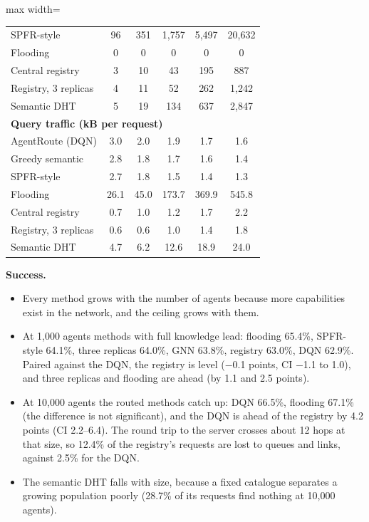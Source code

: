 \documentclass[journal]{IEEEtran}
\begin{document}
\begin{table}[!t]
\begin{adjustbox}{max width=\columnwidth}
\begin{tabular}{lccccc}
SPFR-style & 96 & 351 & 1,757 & 5,497 & 20,632 \\
Flooding & 0 & 0 & 0 & 0 & 0 \\
Central registry & 3 & 10 & 43 & 195 & 887 \\
Registry, 3 replicas & 4 & 11 & 52 & 262 & 1,242 \\
Semantic DHT & 5 & 19 & 134 & 637 & 2,847 \\
\multicolumn{6}{l}{\textbf{Query traffic (kB per request)}} \\
AgentRoute (DQN) & 3.0 & 2.0 & 1.9 & 1.7 & 1.6 \\
Greedy semantic & 2.8 & 1.8 & 1.7 & 1.6 & 1.4 \\
SPFR-style & 2.7 & 1.8 & 1.5 & 1.4 & 1.3 \\
Flooding & 26.1 & 45.0 & 173.7 & 369.9 & 545.8 \\
Central registry & 0.7 & 1.0 & 1.2 & 1.7 & 2.2 \\
Registry, 3 replicas & 0.6 & 0.6 & 1.0 & 1.4 & 1.8 \\
Semantic DHT & 4.7 & 6.2 & 12.6 & 18.9 & 24.0 \\
\bottomrule
\end{tabular}
\end{adjustbox}
\end{table}

\textbf{Success.}

\begin{itemize}
\item Every method grows with the number of agents because more capabilities exist in the network, and the ceiling grows with them.
\item At 1,000 agents methods with full knowledge lead: flooding 65.4\%, SPFR-style 64.1\%, three replicas 64.0\%, GNN 63.8\%, registry 63.0\%, DQN 62.9\%. Paired against the DQN, the registry is level ($-$0.1 points, CI $-$1.1 to 1.0), and three replicas and flooding are ahead (by 1.1 and 2.5 points).
\item At 10,000 agents the routed methods catch up: DQN 66.5\%, flooding 67.1\% (the difference is not significant), and the DQN is ahead of the registry by 4.2 points (CI 2.2--6.4). The round trip to the server crosses about 12 hops at that size, so 12.4\% of the registry's requests are lost to queues and links, against 2.5\% for the DQN.
\item The semantic DHT falls with size, because a fixed catalogue separates a growing population poorly (28.7\% of its requests find nothing at 10,000 agents).
\end{itemize}
\end{document}
